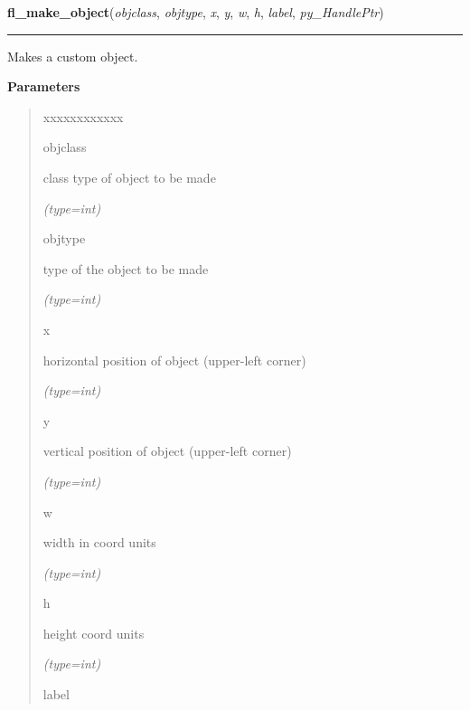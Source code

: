     \vspace{0.5ex}

\hspace{.8\funcindent}\begin{boxedminipage}{\funcwidth}

    \raggedright \textbf{fl\_make\_object}(\textit{objclass}, \textit{objtype}, \textit{x}, \textit{y}, \textit{w}, \textit{h}, \textit{label}, \textit{py\_HandlePtr})

    \vspace{-1.5ex}

    \rule{\textwidth}{0.5\fboxrule}
\setlength{\parskip}{2ex}
    Makes a custom object.

\setlength{\parskip}{1ex}
      \textbf{Parameters}
      \vspace{-1ex}

      \begin{quote}
        \begin{Ventry}{xxxxxxxxxxxx}

          \item[objclass]

          class type of object to be made

            {\it (type=int)}

          \item[objtype]

          type of the object to be made

            {\it (type=int)}

          \item[x]

          horizontal position of object (upper-left corner)

            {\it (type=int)}

          \item[y]

          vertical position of object (upper-left corner)

            {\it (type=int)}

          \item[w]

          width in coord units

            {\it (type=int)}

          \item[h]

          height coord units

            {\it (type=int)}

          \item[label]


\end{Ventry}
\end{quote}
\end{boxedminipage}
